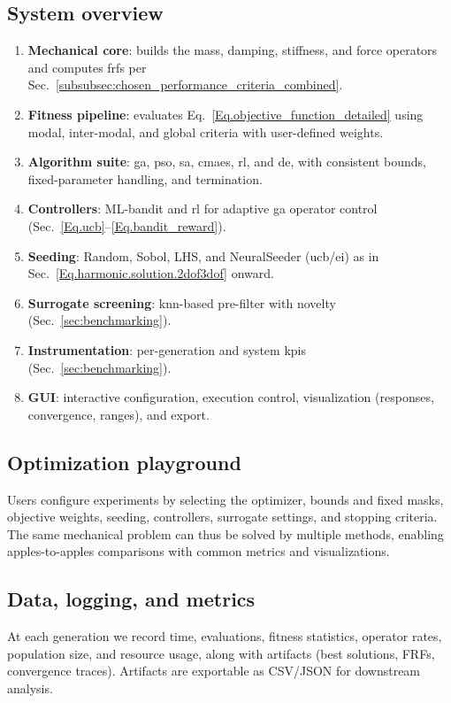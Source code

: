 \documentclass[12pt,a4paper]{article}
\begin{document}
\subsection{System overview}
\begin{enumerate}
    \item \textbf{Mechanical core}: builds the mass, damping, stiffness, and force operators and computes \gls{frf}s per Sec.~\ref{subsubsec:chosen_performance_criteria_combined}.
    \item \textbf{Fitness pipeline}: evaluates Eq.~\eqref{Eq.objective_function_detailed} using modal, inter-modal, and global criteria with user-defined weights.
    \item \textbf{Algorithm suite}: \gls{ga}, \gls{pso}, \gls{sa}, \gls{cmaes}, \gls{rl}, and \gls{de}, with consistent bounds, fixed-parameter handling, and termination.
    \item \textbf{Controllers}: ML-bandit and \gls{rl} for adaptive \gls{ga} operator control (Sec.~\ref{Eq.ucb}--\ref{Eq.bandit_reward}).
    \item \textbf{Seeding}: Random, Sobol, LHS, and NeuralSeeder (\gls{ucb}/\gls{ei}) as in Sec.~\ref{Eq.harmonic.solution.2dof3dof} onward.
    \item \textbf{Surrogate screening}: \gls{knn}-based pre-filter with novelty (Sec.~\ref{sec:benchmarking}).
    \item \textbf{Instrumentation}: per-generation and system \gls{kpi}s (Sec.~\ref{sec:benchmarking}).
    \item \textbf{GUI}: interactive configuration, execution control, visualization (responses, convergence, ranges), and export.
\end{enumerate}

\subsection{Optimization playground}
Users configure experiments by selecting the optimizer, bounds and fixed masks, objective weights, seeding, controllers, surrogate settings, and stopping criteria. The same mechanical problem can thus be solved by multiple methods, enabling apples-to-apples comparisons with common metrics and visualizations.

\subsection{Data, logging, and metrics}
At each generation we record time, evaluations, fitness statistics, operator rates, population size, and resource usage, along with artifacts (best solutions, FRFs, convergence traces). Artifacts are exportable as CSV/JSON for downstream analysis.
\end{document}
